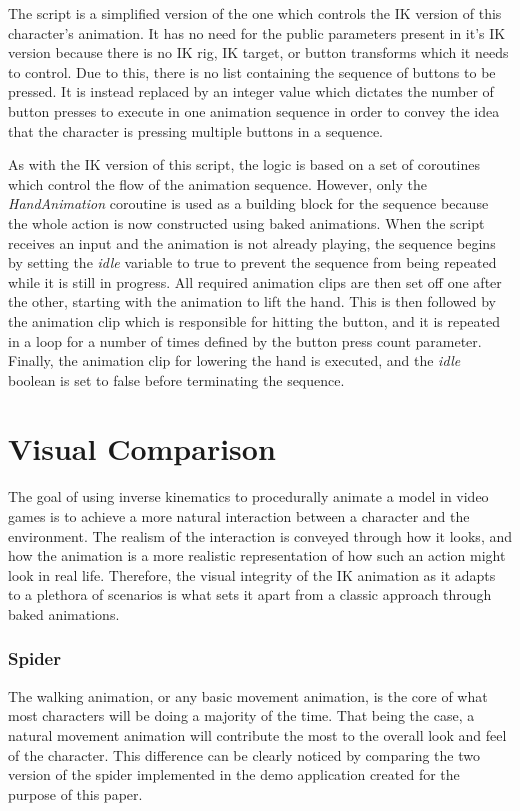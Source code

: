 The script is a simplified version of the one which controls the IK version of
this character's animation. It has no need for the public parameters present in
it's IK version because there is no IK rig, IK target, or button transforms
which it needs to control. Due to this, there is no list containing the sequence
of buttons to be pressed. It is instead replaced by an integer value which
dictates the number of button presses to execute in one animation sequence in
order to convey the idea that the character is pressing multiple buttons in
a sequence. 

As with the IK version of this script, the logic is based on a set of coroutines
which control the flow of the animation sequence. However, only the
\textit{HandAnimation} coroutine is used as a building block for the sequence
because the whole action is now constructed using baked animations. When the
script receives an input and the animation is not already playing, the sequence
begins by setting the \textit{idle} variable to true to prevent the sequence
from being repeated while it is still in progress. All required animation clips
are then set off one after the other, starting with the animation to lift the
hand. This is then followed by the animation clip which is responsible for
hitting the button, and it is repeated in a loop for a number of times defined
by the button press count parameter. Finally, the animation clip for lowering
the hand is executed, and the \textit{idle} boolean is set to false before
terminating the sequence.

\section{Visual Comparison}
The goal of using inverse kinematics to procedurally animate a model in video
games is to achieve a more natural interaction between a character and the
environment. The realism of the interaction is conveyed through how it looks,
and how the animation is a more realistic representation of how such an action
might look in real life. Therefore, the visual integrity of the IK animation as
it adapts to a plethora of scenarios is what sets it apart from a classic
approach through baked animations. 

\subsubsection{Spider}
The walking animation, or any basic movement animation, is the core of what
most characters will be doing a majority of the time. That being the case,
a natural movement animation will contribute the most to the overall look and
feel of the character. This difference can be clearly noticed by comparing the
two version of the spider implemented in the demo application created for the
purpose of this paper. 

